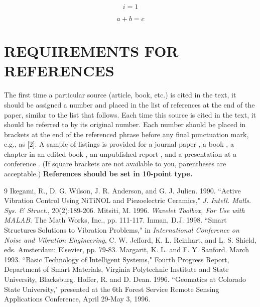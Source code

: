 \documentclass[]{asc}
\begin{document}
\begin{equation}
i = 1 
\label{eq:OneExample}
\end{equation}

\begin{equation}
a + b = c 
\label{eq:TwoExample}
\end{equation}

\section*{REQUIREMENTS FOR REFERENCES} 
The first time a particular source (article, book, etc.) is cited in the text, it should be assigned a number and placed in the list of references at the end of the paper, similar to the list that follows. Each time this source is cited in the text, it should be referred to by its original number. Each number should be placed in brackets at the end of the referenced phrase before any final punctuation mark, e.g., as [2]. A sample of listings is provided for a journal paper \cite{Ikegami}, a book \cite{Mitsiti}, a chapter in an edited book \cite{Inman}, an unpublished report \cite{Margarit}, and a presentation at a conference \cite{Hoffer}. (If square brackets are not available to you, parentheses are acceptable.) \textbf{References should be set in 10-point type.}


\begin{thebibliography}{9}
Ikegami, R., D. G. Wilson, J. R. Anderson, and G. J. Julien. 1990. ``Active Vibration Control Using NiTiNOL and Piezoelectric Ceramics," {\it J. Intell. Matls. Sys. \& Struct.}, 20(2):189-206.
Mitsiti, M. 1996. {\it Wavelet Toolbox, For Use with MALAB}. The Math Works, Inc., pp. 111-117.
Inman, D.J. 1998. ``Smart Structures Solutions to Vibration Problems,"  in {\it International Conference on Noise and Vibration Engineering}, C. W. Jefford, K. L. Reinhart, and L. S. Shield, eds. Amsterdam: Elsevier, pp. 79-83.
Margarit, K. L. and F. Y. Sanford. March 1993. ``Basic Technology of Intelligent Systems," Fourth Progress Report, Department of Smart Materials, Virginia Polytechnic Institute and State University, Blacksburg.
Hoffer, R. and D. Dean. 1996. ``Geomatics at Colorado State University," presented at the 6th Forest Service Remote Sensing Applications Conference, April 29-May 3, 1996.	
\end{thebibliography}
\end{document}
